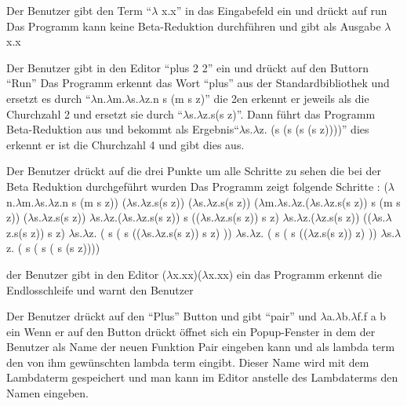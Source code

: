 \documentclass[parskip=full,11pt,twoside]{scrartcl}
\begin{document}
{Der Benutzer gibt den Term \enquote {$\lambda$ x.x} in das Eingabefeld ein und drückt auf run}
{Das Programm kann keine Beta-Reduktion durchführen und gibt als Ausgabe $\lambda$ x.x}

{Der Benutzer gibt in den Editor \enquote {plus 2 2} ein und drückt auf den Buttorn \enquote {Run}}
{ Das Programm erkennt das Wort \enquote {plus} aus der Standardbibliothek und ersetzt es durch \enquote {$\lambda$n.$\lambda$m.$\lambda$s.$\lambda$z.n s (m s z)} die 2en erkennt er jeweils als die Churchzahl 2 und ersetzt sie durch \enquote {$\lambda$s.$\lambda$z.s(s z)}. Dann führt das Programm Beta-Reduktion aus und bekommt als Ergebnis\enquote {$\lambda$s.$\lambda$z. (s (s (s (s z))))} dies erkennt er ist die Churchzahl 4 und gibt dies aus. }

{ Der Benutzer drückt auf die drei Punkte um alle Schritte zu sehen die bei der Beta Reduktion durchgeführt wurden }
{ Das Programm zeigt folgende Schritte : 
\newline ($\lambda$n.$\lambda$m.$\lambda$s.$\lambda$z.n s (m s z)) ($\lambda$s.$\lambda$z.s(s z)) ($\lambda$s.$\lambda$z.s(s z))
\newline ($\lambda$m.$\lambda$s.$\lambda$z.($\lambda$s.$\lambda$z.s(s z)) s (m s z)) ($\lambda$s.$\lambda$z.s(s z))
\newline $\lambda$s.$\lambda$z.($\lambda$s.$\lambda$z.s(s z)) s (($\lambda$s.$\lambda$z.s(s z)) s z) 
\newline $\lambda$s.$\lambda$z.($\lambda$z.s(s z)) (($\lambda$s.$\lambda$z.s(s z)) s z) 
\newline $\lambda$s.$\lambda$z. ( s ( s (($\lambda$s.$\lambda$z.s(s z)) s z) )) 
\newline $\lambda$s.$\lambda$z. ( s ( s (($\lambda$z.s(s z)) z) )) 
\newline $\lambda$s.$\lambda$z. ( s ( s ( s (s z))))
 }

{der Benutzer gibt in den Editor ($\lambda$x.xx)($\lambda$x.xx) ein }
{ das Programm erkennt die Endlosschleife und warnt den Benutzer }

{ Der Benutzer drückt auf den \enquote {Plus} Button und gibt \enquote {pair} und $\lambda$a.$\lambda$b.$\lambda$f.f a b ein }
{Wenn er auf den Button drückt öffnet sich ein Popup-Fenster in dem der Benutzer als Name der neuen Funktion Pair eingeben kann und als lambda term den von ihm gewünschten lambda term eingibt. Dieser Name wird mit dem Lambdaterm gespeichert und man kann im Editor anstelle des Lambdaterms den Namen eingeben. }
\end{document}
